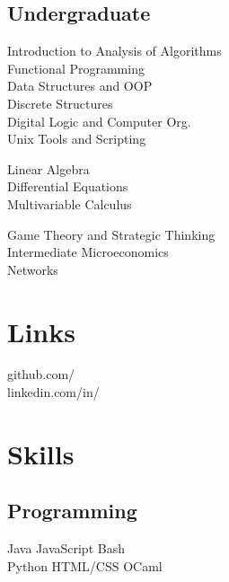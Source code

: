 \documentclass[]{deedy-resume-openfont}
\begin{document}
\begin{minipage}[t]{0.33\textwidth}
\subsection{Undergraduate}
Introduction to Analysis of Algorithms \\
Functional Programming \\
Data Structures and OOP \\
Discrete Structures \\
Digital Logic and Computer Org. \\
Unix Tools and Scripting \newline

Linear Algebra \\
Differential Equations\\
Multivariable Calculus\newline

Game Theory and Strategic Thinking\\
Intermediate Microeconomics\\
Networks \\
\sectionsep


\section{Links} 
github.com/\href{https://github.com/kuang}{} \\
linkedin.com/in/\href{https://www.linkedin.com/in/kuangjustin}{} \\
\sectionsep

\section{Skills}
\subsection{Programming}
Java \textbullet{}   JavaScript \textbullet{} Bash \\
Python \textbullet{} HTML/CSS \textbullet OCaml
\newline
\newline


\end{minipage}
\end{document}
